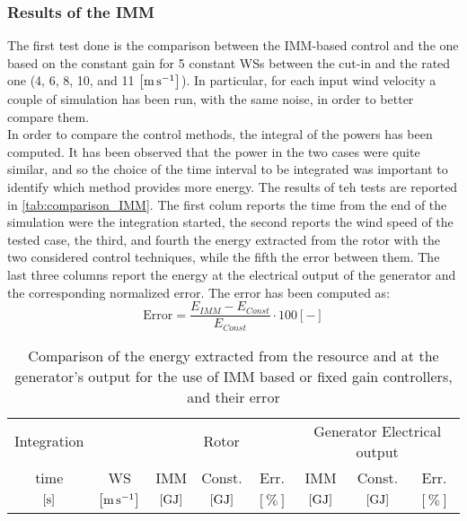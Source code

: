 \subsubsection{Results of the IMM} 
The first test done is the comparison between the IMM-based control and the one based on the constant gain for 5 constant WSs between the cut-in and the rated one (4, 6, 8, 10, and 11 $\left[\si{\meter\per\second}\right]$). In particular, for each input wind velocity a couple of simulation has been run, with the same noise, in order to better compare them. \\
In order to compare the control methods, the integral of the powers has been computed. It has been observed that the power in the two cases were quite similar, and so the choice of the time interval to be integrated was important to identify which method provides more energy. The results of teh tests are reported in \autoref{tab:comparison_IMM}. The first colum reports the time from the end of the simulation were the integration started, the second reports the wind speed of the tested case, the third, and fourth the energy extracted from the rotor with the two considered control techniques, while the fifth the error between them. The last three columns report the energy at the electrical output of the generator and the corresponding normalized error. The error has been computed as:
\begin{equation}
  \text{Error} = \frac{E_{IMM}-E_{Const}}{E_{Const}}\cdot 100 \left[-\right]
  \label{eq:energy_error}
\end{equation}

\begin{table}[htb]
  \caption{Comparison of the energy extracted from the resource and at the generator's output for the use of IMM based or fixed gain controllers, and their error}
  \centering
  \begin{tabular}{cc|ccc|ccc}
    \toprule
    Integration & & \multicolumn{3}{c|}{Rotor} & \multicolumn{3}{c}{Generator Electrical output}\\
    time & WS & IMM & Const. & Err. & IMM & Const. & Err.\\
    $\left[\si{\second}\right]$ & $\left[\si{\meter\per\second}\right]$ & $\left[\si{\giga\joule}\right]$ &   $\left[\si{\giga\joule}\right]$ & $\left[\%\right]$& $\left[\si{\giga\joule}\right]$ &   $\left[\si{\giga\joule}\right]$ & $\left[\%\right]$ \\
    \midrule
    
  \end{tabular}
  \label{tab:comparison_IMM}
\end{table}

